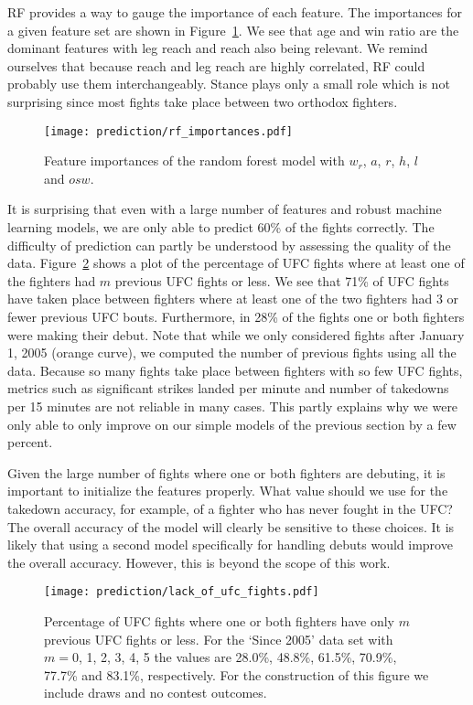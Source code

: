 RF provides a way to gauge the importance of
each feature. The importances for a given feature
set are shown in Figure~\ref{rf_importances}. We see that age
and win ratio are the dominant features with leg reach and reach
also being relevant. We remind ourselves that because reach and leg reach
are highly correlated, RF could probably use them interchangeably. Stance
plays only a small role which is not surprising since most fights
take place between two orthodox fighters.

\begin{figure}[h]
\begin{center}
\texttt{[image: prediction/rf\_importances.pdf]}
\caption{Feature importances of the random forest model with $w_r$,
$a$, $r$, $h$, $l$ and $osw$.}
\label{rf_importances}
\end{center}
\end{figure}

It is surprising that even with a large number of features
and robust machine learning models, we are only able to
predict 60\% of the fights correctly. 
The difficulty of prediction can partly be understood by assessing the
quality of the data. Figure~\ref{lack_of_ufc_fights} shows
a plot of the percentage of UFC fights where at least one of the
fighters had $m$ previous UFC fights or less. We see that 71\% of UFC fights
have taken place between fighters where at least one of the two
fighters had 3 or fewer previous UFC
bouts. Furthermore, in 28\% of the fights one or both
fighters were making their debut.
Note that while we only considered fights after January 1, 2005 (orange curve),
we computed the number of previous fights using all the data. Because
so many fights take place between fighters with so few UFC fights,
metrics such as significant
strikes landed per minute and number of takedowns per 15 minutes
are not reliable in many cases.
This partly explains why we were only able to only improve on
our simple models of the previous section by a few percent.

Given the large number of fights where one or both fighters
are debuting, it is important to initialize the features properly.
What value should we use for the takedown accuracy, for example, of a
fighter who has never fought in the UFC?
The overall accuracy of the model
will clearly be sensitive to these choices. It is likely that
using a second model specifically for handling debuts would improve
the overall accuracy. However, this is beyond the scope of this
work.

\begin{figure}[h]
\begin{center}
\texttt{[image: prediction/lack\_of\_ufc\_fights.pdf]}
\caption{Percentage of UFC fights where one or both fighters
have only $m$ previous UFC fights or less. For the
`Since 2005' data set with $m=0$, 1, 2, 3, 4, 5 the values are
28.0\%, 48.8\%, 61.5\%, 70.9\%, 77.7\% and 83.1\%, respectively.
For the construction of this figure we include draws and 
no contest outcomes.}
\label{lack_of_ufc_fights}
\end{center}
\end{figure}

